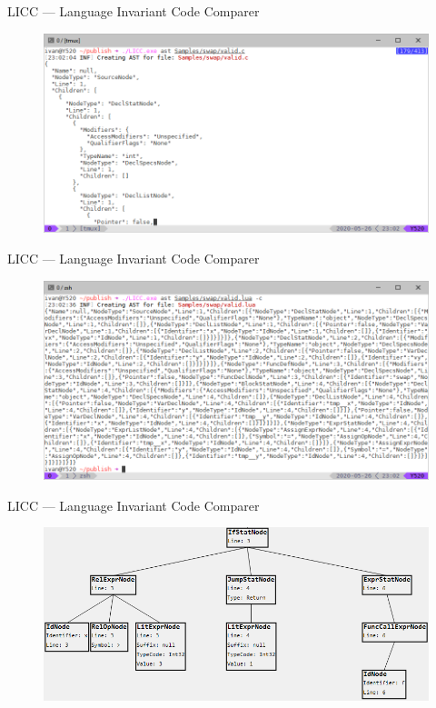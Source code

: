 \documentclass{beamer}
\begin{document}
\begin{frame}{LICC --- Language Invariant Code Comparer}
    \begin{figure}[h!]
        \centering
        \includegraphics[scale=0.5]{images/eval/ast_c.PNG}
    \end{figure}
\end{frame}

\begin{frame}{LICC --- Language Invariant Code Comparer}
    \begin{figure}[h!]
        \centering
        \includegraphics[scale=0.5]{images/eval/ast_lua.PNG}
    \end{figure}
\end{frame}

\begin{frame}{LICC --- Language Invariant Code Comparer}
    \begin{figure}[h!]
        \centering
        \includegraphics[scale=0.5]{images/ast_stat.png}
    \end{figure}
\end{frame}
\end{document}
